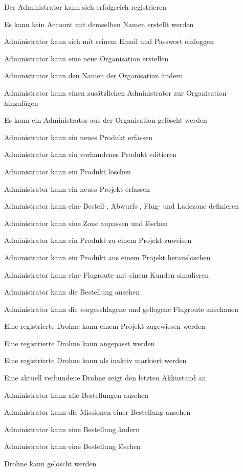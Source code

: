 \begin{todolist}
	\item[\done] Der Administrator kann sich erfolgreich registrieren
	\item[\done] Es kann kein Account mit demselben Namen erstellt werden
	\item[\done] Administrator kann sich mit seinem Email und Passwort einloggen
	\item[\done] Administrator kann eine neue Organisation erstellen
	\item[\done] Administrator kann den Namen der Organisation ändern
	\item[\done] Administrator kann einen zusätzlichen Administrator zur Organisation hinzufügen
	\item[\done] Es kann ein Administrator aus der Organisation gelöscht werden
	\item[\done] Administrator kann ein neues Produkt erfassen
	\item[\done] Administrator kann ein vorhandenes Produkt editieren
	\item[\done] Administrator kann ein Produkt löschen
	\item[\done] Administrator kann ein neues Projekt erfassen
	\item[\done] Administrator kann eine Bestell-, Abwurfs-, Flug- und Ladezone definieren
	\item[\done] Administrator kann eine Zone anpassen und löschen
	\item[\done] Administrator kann ein Produkt zu einem Projekt zuweisen
	\item[\done] Administrator kann ein Produkt aus einem Projekt herauslöschen
	\item[\done] Administrator kann eine Flugroute mit einem Kunden simulieren

	\item[\done] Administrator kann die Bestellung ansehen
	\item[\done] Administrator kann die vorgeschlagene und geflogene Flugroute anschauen

	\item[\done] Eine registrierte Drohne kann einem Projekt zugewiesen werden
	\item[\done] Eine registrierte Drohne kann angepasst werden
	\item[\done] Eine registrierte Drohne kann als inaktiv markiert werden
	\item[\done] Eine aktuell verbundene Drohne zeigt den letzten Akkustand an
	\item[\done] Administrator kann alle Bestellungen ansehen
	\item[\done] Administrator kann die Missionen einer Bestellung ansehen

	\item Administrator kann eine Bestellung ändern 
	\item Administrator kann eine Bestellung löschen 
	\item Drohne kann gelöscht werden 


\end{todolist}

